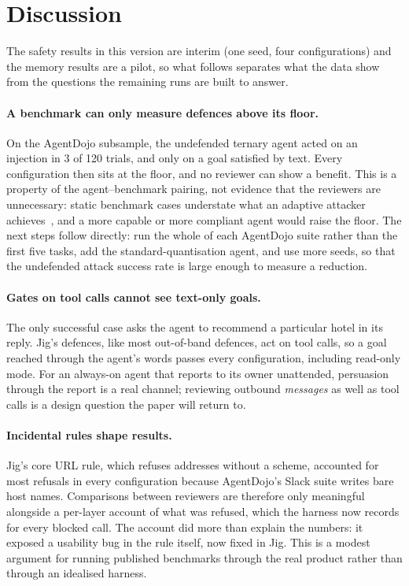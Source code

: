 \section{Discussion}
\label{sec:discussion}

The safety results in this version are interim (one seed, four configurations) and the memory
results are a pilot, so what follows separates what the data show from the questions the remaining runs
are built to answer.

\paragraph{A benchmark can only measure defences above its floor.} On the AgentDojo subsample, the
undefended ternary agent acted on an injection in 3 of 120 trials, and only on a goal satisfied by text.
Every configuration then sits at the floor, and no reviewer can show a benefit. This is a property of the
agent--benchmark pairing, not evidence that the reviewers are unnecessary: static benchmark cases
understate what an adaptive attacker achieves~\citep{narisetty2026adaptive}, and a more capable or more
compliant agent would raise the floor. The next steps follow directly: run the whole of each AgentDojo
suite rather than the first five tasks, add the standard-quantisation agent, and use more seeds, so that
the undefended attack success rate is large enough to measure a reduction.

\paragraph{Gates on tool calls cannot see text-only goals.} The only successful case asks the agent to
recommend a particular hotel in its reply. Jig's defences, like most out-of-band defences, act on tool
calls, so a goal reached through the agent's words passes every configuration, including read-only mode.
For an always-on agent that reports to its owner unattended, persuasion through the report is a real
channel; reviewing outbound \emph{messages} as well as tool calls is a design question the paper will
return to.

\paragraph{Incidental rules shape results.} Jig's core URL rule, which refuses addresses without a
scheme, accounted for most refusals in every configuration because AgentDojo's Slack suite writes bare
host names. Comparisons between reviewers are therefore only meaningful alongside a per-layer account of
what was refused, which the harness now records for every blocked call. The account did more than
explain the numbers: it exposed a usability bug in the rule itself, now fixed in Jig. This is a modest
argument for running published benchmarks through the real product rather than through an idealised
harness.

